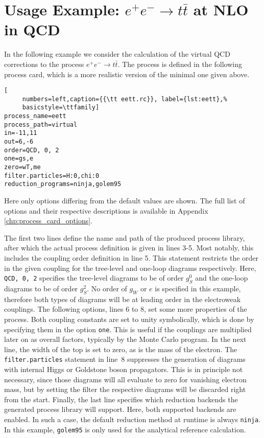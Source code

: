\documentclass[11pt,a4paper]{refrep}
\begin{document}
\section{Usage Example: \texorpdfstring{$e^+e^-\rightarrow t\bar{t}$}{e+e- to tt-bar}
at NLO in QCD}\label{sec:usage}
In the following example we consider the calculation of the virtual QCD corrections to the process $e^+e^-\rightarrow t\bar{t}$. The process is defined in the following process card, which is a more realistic version of the minimal one given above.

\begin{lstlisting}[
     numbers=left,caption={{\tt eett.rc}}, label={lst:eett},%
     basicstyle=\ttfamily] 
process_name=eett
process_path=virtual
in=-11,11
out=6,-6
order=QCD, 0, 2
one=gs,e
zero=wT,me
filter.particles=H:0,chi:0
reduction_programs=ninja,golem95
\end{lstlisting}

Here only options differing from the default values are shown. The full list of options and their respective descriptions is available in Appendix \ref{chp:process_card_options}.

The first two lines define the name and path of the produced process library, after which the actual process definition is given in lines 3-5. Most notably, this includes the coupling order definition in line 5. This statement restricts the order in the given coupling for the tree-level and one-loop diagrams respectively. Here, \texttt{QCD, 0, 2} specifies the tree-level diagrams to be of order $g_S^0$ and the one-loop diagrams to be of order $g_S^2$. No order of $g_W$ or $e$ is specified in this example, therefore both types of diagrams will be at leading order in the electroweak couplings.
The following options, lines 6 to 8, set some more properties of the process. Both coupling constants are set to unity symbolically, which is done by specifying them in the option \texttt{one}. This is useful if the couplings are multiplied later on as overall factors, typically by the Monte Carlo program. In the next line, the width of the top is set to zero, as is the mass of the electron. The \texttt{filter.particles} statement in line~8 suppresses the generation of diagrams with internal Higgs or Goldstone boson propagators. This is in principle not necessary, since those diagrams will all evaluate to zero for vanishing electron mass, but by setting the filter the respective diagrams will be discarded right from the start. Finally, the last line specifies which reduction backends the generated process library will support. Here, both supported backends are enabled. In such a case, the default reduction method at runtime is always \texttt{ninja}. In this example, \texttt{golem95} is only used for the analytical reference calculation.
\end{document}
